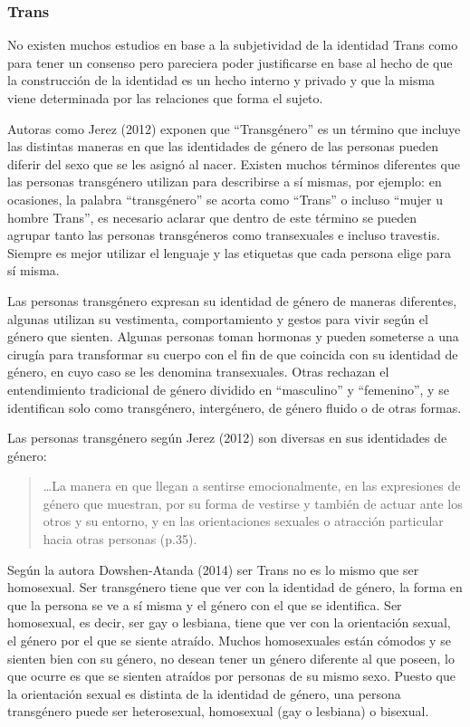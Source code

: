 \subsubsection{Trans}
No existen muchos estudios en base a la subjetividad de la identidad Trans como
para tener un consenso pero pareciera poder justificarse en base al hecho de que
la construcción de la identidad es un hecho interno y privado y que la misma
viene determinada por las relaciones que forma el sujeto.

Autoras como Jerez (2012) exponen que “Transgénero” es un término que incluye
las distintas maneras en que las identidades de género de las personas pueden
diferir del sexo que se les asignó al nacer.
Existen muchos términos diferentes que las personas transgénero utilizan para
describirse a sí mismas, por ejemplo: en ocasiones, la palabra “transgénero” se
acorta como “Trans” o incluso “mujer u  hombre Trans”, es necesario aclarar que
dentro de este término se pueden agrupar tanto las personas transgéneros como
transexuales e incluso travestis.
Siempre es mejor utilizar el lenguaje y las etiquetas que cada persona elige
para sí misma.

Las personas transgénero expresan su identidad de género de maneras diferentes,
algunas utilizan su vestimenta, comportamiento y gestos para vivir según el
género que sienten.
Algunas personas toman hormonas y pueden someterse a una cirugía para
transformar su cuerpo con el fin de que coincida con su identidad de género, en
cuyo caso se les denomina transexuales.
Otras rechazan el entendimiento tradicional de género dividido en “masculino” y
“femenino”, y se identifican solo como transgénero, intergénero, de género
fluido o de otras formas.

Las personas transgénero según Jerez (2012) son diversas en sus identidades de
género:

\begin{quote}
    …La manera en que llegan a sentirse emocionalmente, en las expresiones de
    género que muestran, por su forma de vestirse y también de actuar ante los
    otros y su entorno, y en las orientaciones sexuales o atracción particular
    hacia otras personas (p.35).
\end{quote}

Según la autora Dowshen-Atanda (2014) ser Trans no es lo mismo que ser
homosexual.
Ser transgénero tiene que ver con la identidad de género, la forma en que la
persona se ve a sí misma y el género con el que se identifica.
Ser homosexual, es decir, ser gay o lesbiana, tiene que ver con la orientación
sexual, el género por el que se siente atraído.
Muchos homosexuales están cómodos y se sienten bien con su género, no desean
tener un género diferente al que poseen, lo que ocurre es que se sienten
atraídos por personas de su mismo sexo.
Puesto que la orientación sexual es distinta de la identidad de género, una
persona transgénero puede ser heterosexual, homosexual (gay o lesbiana) o
bisexual.

